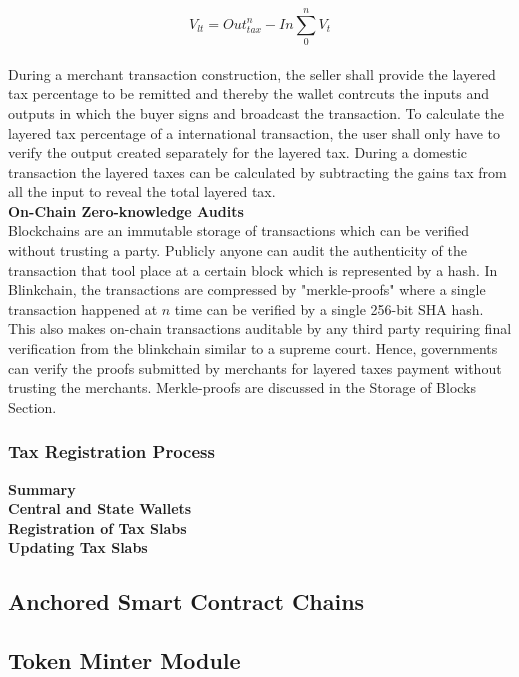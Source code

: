 \documentclass[letterpaper,11pt]{article}
\begin{document}
\[V_{lt} = Out_{tax}^n - In\sum_{0}^{n} V_t \]\\


During a merchant transaction construction, the seller shall provide the layered tax percentage to be remitted and thereby the wallet contrcuts the inputs and outputs in which the buyer signs and broadcast the transaction. To calculate the layered tax percentage of a international transaction, the user shall only have to verify the output created separately for the layered tax. During a domestic transaction the layered taxes can be calculated by subtracting the gains tax from all the input to reveal the total layered tax.\\


\textbf{On-Chain Zero-knowledge Audits}\\

Blockchains are an immutable storage of transactions which can be verified without trusting a party. Publicly anyone can audit the authenticity of the transaction that tool place at a certain block which is represented by a hash. In Blinkchain, the transactions are compressed by "merkle-proofs" where a single transaction happened at $n$ time can be verified by a single 256-bit SHA hash. This also makes on-chain transactions auditable by any third party requiring final verification from the blinkchain similar to a supreme court. Hence, governments can verify the proofs submitted by merchants for layered taxes payment without trusting the merchants. Merkle-proofs are discussed in the Storage of Blocks Section.

\subsubsection{Tax Registration Process}

\textbf{Summary}\\

\textbf{Central and State Wallets}\\

\textbf{Registration of Tax Slabs}\\

\textbf{Updating Tax Slabs}\\


\subsection{Anchored Smart Contract Chains}

\subsection{Token Minter Module}
	
\end{document}
